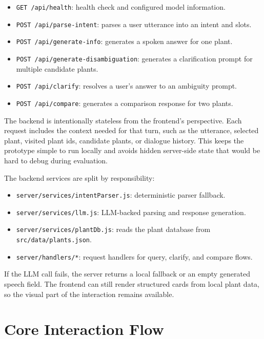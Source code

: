 \documentclass[12pt,a4paper]{article}
\begin{document}
\begin{itemize}
    \item \texttt{GET /api/health}: health check and configured model information.
    \item \texttt{POST /api/parse-intent}: parses a user utterance into an intent
    and slots.
    \item \texttt{POST /api/generate-info}: generates a spoken answer for one
    plant.
    \item \texttt{POST /api/generate-disambiguation}: generates a clarification
    prompt for multiple candidate plants.
    \item \texttt{POST /api/clarify}: resolves a user's answer to an ambiguity
    prompt.
    \item \texttt{POST /api/compare}: generates a comparison response for two
    plants.
\end{itemize}

The backend is intentionally stateless from the frontend's perspective. Each
request includes the context needed for that turn, such as the utterance,
selected plant, visited plant ids, candidate plants, or dialogue history. This
keeps the prototype simple to run locally and avoids hidden server-side state
that would be hard to debug during evaluation.

The backend services are split by responsibility:

\begin{itemize}
    \item \texttt{server/services/intentParser.js}: deterministic parser fallback.
    \item \texttt{server/services/llm.js}: LLM-backed parsing and response generation.
    \item \texttt{server/services/plantDb.js}: reads the plant database from
    \texttt{src/data/plants.json}.
    \item \texttt{server/handlers/*}: request handlers for query, clarify, and
    compare flows.
\end{itemize}

If the LLM call fails, the server returns a local fallback or an empty generated
speech field. The frontend can still render structured cards from local plant
data, so the visual part of the interaction remains available.

\section{Core Interaction Flow}
\end{document}
